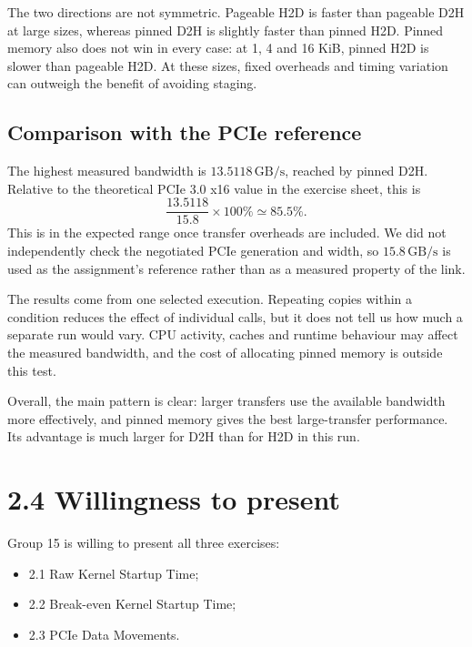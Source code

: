 \documentclass[11pt,a4paper]{article}
\begin{document}
The two directions are not symmetric. Pageable H2D is faster than pageable
D2H at large sizes, whereas pinned D2H is slightly faster than pinned H2D.
Pinned memory also does not win in every case: at 1, 4 and 16 KiB, pinned H2D
is slower than pageable H2D. At these sizes, fixed overheads and timing
variation can outweigh the benefit of avoiding staging.

\subsection*{Comparison with the PCIe reference}

The highest measured bandwidth is \(13.5118\,\mathrm{GB/s}\), reached by
pinned D2H. Relative to the theoretical PCIe 3.0 x16 value in the exercise
sheet, this is
\[
    \frac{13.5118}{15.8}\times100\% \simeq 85.5\%.
\]
This is in the expected range once transfer overheads are included. We did
not independently check the negotiated PCIe generation and width, so
\(15.8\,\mathrm{GB/s}\) is used as the assignment's reference rather than
as a measured property of the link.

The results come from one selected execution. Repeating copies within a
condition reduces the effect of individual calls, but it does not tell us
how much a separate run would vary. CPU activity, caches and runtime behaviour
may affect the measured bandwidth, and the cost of allocating pinned memory
is outside this test.

Overall, the main pattern is clear: larger transfers use the available
bandwidth more effectively, and pinned memory gives the best large-transfer
performance. Its advantage is much larger for D2H than for H2D in this run.

\section*{2.4 Willingness to present}

Group 15 is willing to present all three exercises:
\begin{itemize}
    \item 2.1 Raw Kernel Startup Time;
    \item 2.2 Break-even Kernel Startup Time;
    \item 2.3 PCIe Data Movements.
\end{itemize}
\end{document}
